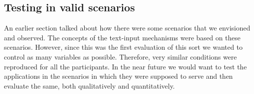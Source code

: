 \subsection{Testing in valid scenarios}
An earlier section talked about how there were some scenarios that we envisioned and observed. The concepts of the text-input mechanisms were based on these scenarios. However, since this was the first evaluation of this sort we wanted to control as many variables as possible. Therefore, very similar conditions were reproduced for all the participants. In the near future we would want to test the applications in the scenarios in which they were supposed to serve and then evaluate the same, both qualitatively and quantitatively.